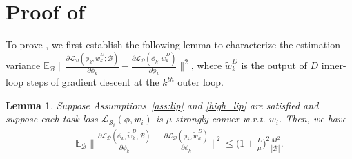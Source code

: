 \documentclass{osudissert96}
\def\gB{{\mathcal{B}}}
\def\gD{{\mathcal{D}}}
\def\gL{{\mathcal{L}}}
\def\gS{{\mathcal{S}}}
\newtheorem{lemma}{Lemma}
\begin{document}
\section{Proof of }
To prove , we first establish the following lemma to  characterize the estimation variance $\mathbb{E}_\gB\big\|\frac{\partial \gL_{\gD} (\phi_k,\widetilde w^D_k;\gB)}{\partial \phi_k} - \frac{\partial \gL_{\gD} (\phi_k,\widetilde w^D_k)}{\partial \phi_k} \big\|^2$, where $\widetilde w_k^{D}$ is the output of $D$ inner-loop steps of gradient descent at the $k^{th}$ outer loop. \begin{lemma}\label{le:bvarinace}
Suppose Assumptions~\ref{ass:lip} and \ref{high_lip} are satisfied and suppose each task loss $\gL_{\gS_i}(\phi,w_i)$ is $\mu$-strongly-convex w.r.t. $w_i$.  Then, we have
\begin{align*}
\mathbb{E}_\gB\Big\|\frac{\partial \gL_{\gD} (\phi_k, \widetilde w^D_k;\gB)}{\partial \phi_k} - \frac{\partial \gL_{\gD} (\phi_k, \widetilde w^D_k)}{\partial \phi_k} \Big\|^2 \leq \Big(1+\frac{L}{\mu}\Big)^2\frac{M^2}{|\gB|}.
\end{align*}
\end{lemma}
\end{document}
